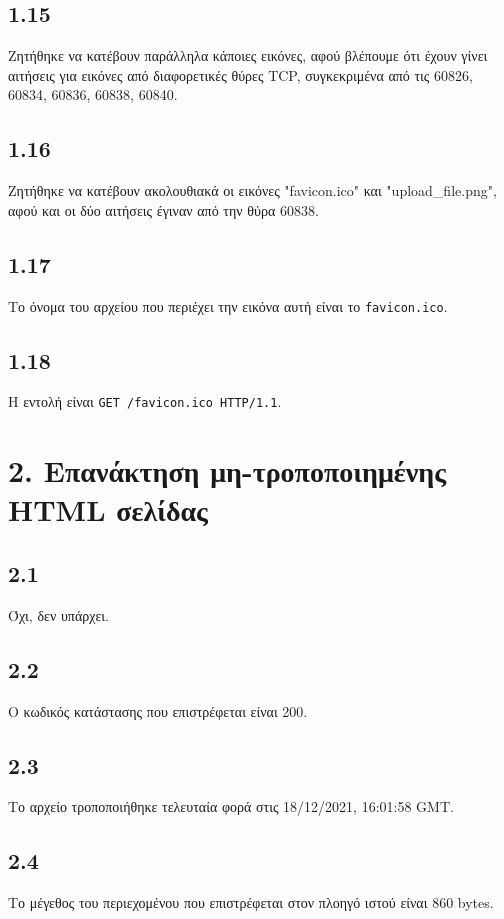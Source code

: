 		\subsection*{1.15}
			Ζητήθηκε να κατέβουν παράλληλα κάποιες εικόνες, αφού βλέπουμε ότι έχουν γίνει αιτήσεις για εικόνες από διαφορετικές θύρες TCP, συγκεκριμένα από τις 60826, 60834, 60836, 60838, 60840.

		\subsection*{1.16}
			Ζητήθηκε να κατέβουν ακολουθιακά οι εικόνες "favicon.ico" και "upload\_file.png", αφού και οι δύο αιτήσεις έγιναν από την θύρα 60838.
			
		\subsection*{1.17}
			Το όνομα του αρχείου που περιέχει την εικόνα αυτή είναι το \verb|favicon.ico|.
		
		\subsection*{1.18}
			Η εντολή είναι \verb|GET /favicon.ico HTTP/1.1|.
		
	\section*{2. Επανάκτηση μη-τροποποιημένης HTML σελίδας}
		
		\subsection*{2.1}
			Όχι, δεν υπάρχει.
	
		\subsection*{2.2}
			Ο κωδικός κατάστασης που επιστρέφεται είναι 200.
	
		\subsection*{2.3}
			Το αρχείο τροποποιήθηκε τελευταία φορά στις 18/12/2021, 16:01:58 GMT.
	
		\subsection*{2.4}
			Το μέγεθος του περιεχομένου που επιστρέφεται στον πλοηγό ιστού είναι 860 bytes.
	
